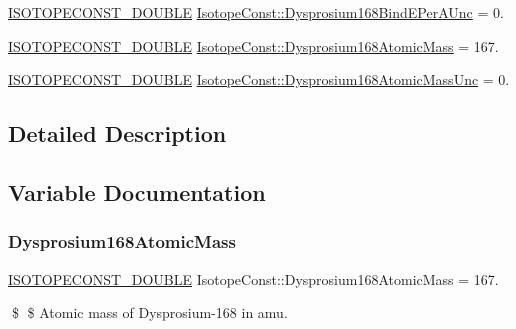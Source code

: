 \begin{DoxyCompactItemize}
\item 
\mbox{\hyperlink{group___isotope_const-_macros_ga8f45a7272ce02c0b4c65c44636ed719a}{I\+S\+O\+T\+O\+P\+E\+C\+O\+N\+S\+T\+\_\+\+D\+O\+U\+B\+LE}} \mbox{\hyperlink{group___isotope_const-_dysprosium-_dy168_ga7b1aa2377c1566ee5d83e86504a8f4c4}{Isotope\+Const\+::\+Dysprosium168\+Bind\+E\+Per\+A\+Unc}} = 0.
\item 
\mbox{\hyperlink{group___isotope_const-_macros_ga8f45a7272ce02c0b4c65c44636ed719a}{I\+S\+O\+T\+O\+P\+E\+C\+O\+N\+S\+T\+\_\+\+D\+O\+U\+B\+LE}} \mbox{\hyperlink{group___isotope_const-_dysprosium-_dy168_ga9f8e4abe1eb95397c50a8c030c46ae2d}{Isotope\+Const\+::\+Dysprosium168\+Atomic\+Mass}} = 167.
\item 
\mbox{\hyperlink{group___isotope_const-_macros_ga8f45a7272ce02c0b4c65c44636ed719a}{I\+S\+O\+T\+O\+P\+E\+C\+O\+N\+S\+T\+\_\+\+D\+O\+U\+B\+LE}} \mbox{\hyperlink{group___isotope_const-_dysprosium-_dy168_gaa7ef5b9f0bb441d5c91bf1d691f49900}{Isotope\+Const\+::\+Dysprosium168\+Atomic\+Mass\+Unc}} = 0.
\end{DoxyCompactItemize}


\subsection{Detailed Description}


\subsection{Variable Documentation}
\mbox{\label{group___isotope_const-_dysprosium-_dy168_ga9f8e4abe1eb95397c50a8c030c46ae2d}} 
\subsubsection{\texorpdfstring{Dysprosium168\+Atomic\+Mass}{Dysprosium168AtomicMass}}
{\footnotesize\ttfamily \mbox{\hyperlink{group___isotope_const-_macros_ga8f45a7272ce02c0b4c65c44636ed719a}{I\+S\+O\+T\+O\+P\+E\+C\+O\+N\+S\+T\+\_\+\+D\+O\+U\+B\+LE}} Isotope\+Const\+::\+Dysprosium168\+Atomic\+Mass = 167.}

\$ \$ Atomic mass of Dysprosium-\/168 in amu. \mbox{\label{group___isotope_const-_dysprosium-_dy168_gaa7ef5b9f0bb441d5c91bf1d691f49900}} 
